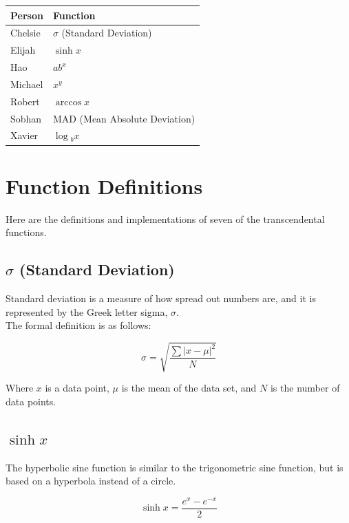 \documentclass[11pt,onside]{report}
\begin{document}
\begin{center}
\begin{tabular}{|l|l|}
    \hline
    \bf{Person} & \bf{Function}  \\
    \hline
    Chelsie & $\sigma{}$ (Standard Deviation) \\
    \hline
    Elijah & $\sinh{x}$ \\
    \hline
    Hao & $ab^x$ \\
    \hline
    Michael & $x^y$ \\
    \hline
    Robert & $\arccos{x}$ \\
    \hline
    Sobhan & MAD (Mean Absolute Deviation) \\
    \hline
    Xavier & $\log{}_bx$ \\
    \hline
\end{tabular}
\end{center}

\section{Function Definitions}
\begin{description}
Here are the definitions and implementations of seven of the transcendental functions.
\end{description}

\subsection{$\sigma$ (Standard Deviation)}
\begin{description}
    Standard deviation is a measure of how spread out numbers are, and it is represented by the Greek letter sigma, $\sigma$. \\
    The formal definition is as follows:
\end{description}
\begin{equation}
    \sigma = \sqrt{\frac{\sum |x-\mu|^2}{N}}
\end{equation}
\begin{description}
Where $x$ is a data point, $\mu$ is the mean of the data set, and $N$ is the number of data points. \cite{standard_deviation}
\end{description}

\subsection{$\sinh{x}$}
\begin{description}
The hyperbolic sine function is similar to the trigonometric sine function, but is based on a hyperbola instead of a circle. \cite{sinh}
\end{description}
\begin{equation}
    \sinh{x} = \frac{e^x-e^{-x}}{2}
\end{equation}
\end{document}
